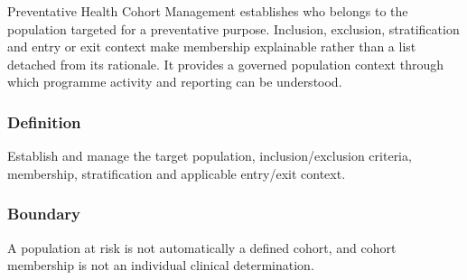 Preventative Health Cohort Management establishes who belongs to the population targeted for a preventative purpose. Inclusion, exclusion, stratification and entry or exit context make membership explainable rather than a list detached from its rationale. It provides a governed population context through which programme activity and reporting can be understood.

\subsubsection*{Definition}

Establish and manage the target population, inclusion/\allowbreak{}exclusion criteria, membership, stratification and applicable entry/\allowbreak{}exit context.

\subsubsection*{Boundary}

A population at risk is not automatically a defined cohort, and cohort membership is not an individual clinical determination.

